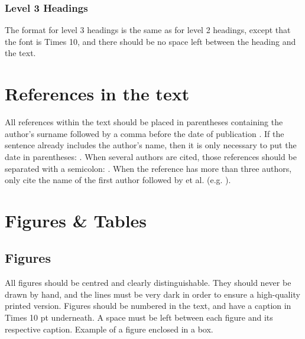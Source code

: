 \documentclass[10pt, a4paper]{article}
\begin{document}
\subsubsection{Level 3 Headings}

The format for level 3 headings is the same as for level 2 headings, except that the font is Times 10, and there should be no space left between the heading and the text.

%

\section{References in the text}

All references within the text should be placed in parentheses containing the author's surname followed by a comma before the date of publication \cite{Martin-90}. If the sentence already includes the author's name, then it is only necessary to put the date in parentheses: . When several authors are cited, those references should be separated with a semicolon: \cite{Martin-90,CastorPollux-92}. When the reference has more than three authors, only cite the name of the first author followed by et al. (e.g. \cite{Superman-Batman-Catwoman-Spiderman-00}).

\section{Figures \& Tables}
\subsection{Figures}

All figures should be centred and clearly distinguishable. They should never be drawn by hand, and the lines must be very dark in order to ensure a high-quality printed version. Figures should be numbered in the text, and have a caption in Times 10 pt underneath. A space must be left between each figure and its respective caption.
Example of a figure enclosed in a box.
\end{document}
